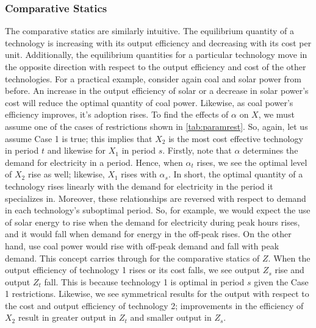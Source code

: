 \documentclass[11pt,a4paper,leqno]{extarticle}
\begin{document}
	
	
	\subsubsection{Comparative Statics}
	
	
	The comparative statics are similarly intuitive. The equilibrium quantity of a technology is increasing with its output efficiency and decreasing with its cost per unit. Additionally, the equilibrium quantities for a particular technology move in the opposite direction with respect to the output efficiency and cost of the other technologies. For a practical example, consider again coal and solar power from before. An increase in the output efficiency of solar or a decrease in solar power's cost will reduce the optimal quantity of coal power. Likewise, as coal power's efficiency improves, it's adoption rises. To find the effects of $\alpha$ on $X$, we must assume one of the cases of restrictions shown in  \autoref{tab:paramrest}. So, again, let us assume Case 1 is true; this implies that $X_2$ is the most cost effective technology in period $t$ and likewise for $X_1$ in period $s$. Firstly, note that $\alpha$ determines the demand for electricity in a period. Hence, when $\alpha_t$ rises, we see the optimal level of $X_2$ rise as well; likewise, $X_1$ rises with $\alpha_s$. In short, the optimal quantity of a technology rises linearly with the demand for electricity in the period it specializes in. Moreover, these relationships are reversed with respect to demand in each technology's suboptimal period. So, for example, we would expect the use of solar energy to rise when the demand for electricity during peak hours rises, and it would fall when demand for energy in the off-peak rises. On the other hand, use coal power would rise with off-peak demand and fall with peak demand. This concept carries through for the comparative statics of $Z$. When the output efficiency of technology 1 rises or its cost falls, we see output $Z_s$ rise and output $Z_t$ fall. This is because technology 1 is optimal in period $s$ given the Case 1 restrictions. Likewise, we see symmetrical results for the output with respect to the cost and output efficiency of technology 2; improvements in the efficiency of $X_2$ result in greater output in $Z_t$ and smaller output in $Z_s$.  
	
\end{document}
